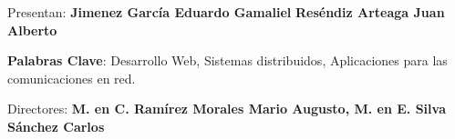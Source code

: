 \begin{titlepage}
\begin{center}
    \end{center}

    \vspace{1.5cm}

    \begin{center}
    Presentan: \linebreak
    \textbf{Jimenez García Eduardo Gamaliel} \linebreak
    \textbf{Reséndiz Arteaga Juan Alberto} \linebreak
    \end{center}

    \vspace{1.5cm}



    \textbf{Palabras Clave}:  Desarrollo Web, Sistemas distribuidos, Aplicaciones para las comunicaciones en red.

    \vspace{1.5cm}
     
    \begin{center}


    Directores: \linebreak
    \textbf{ M. en C. Ram\'irez Morales Mario Augusto, M. en E.  Silva S\'anchez Carlos}

    \end{center}
\end{titlepage}
